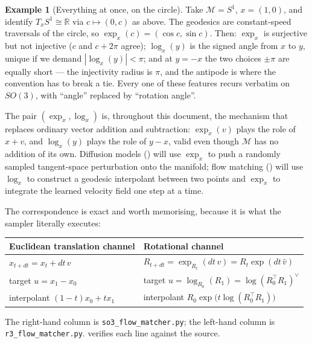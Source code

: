 \documentclass[11pt,a4paper]{report}
\theoremstyle{definition}
\newtheorem{example}[example]{Example}
\theoremstyle{remark}
\newcommand{\RR}{\mathbb R}
\newcommand{\file}[1]{\texttt{#1}}
\begin{document}
\begin{example}[Everything at once, on the circle]
Take $\mathcal M=S^1$, $x=(1,0)$, and identify $T_xS^1\cong\RR$ via
$c\mapsto(0,c)$ as above. The geodesics are constant-speed traversals of the
circle, so $\exp_x(c)=(\cos c,\sin c)$. Then:
$\exp_x$ is surjective but not injective ($c$ and $c+2\pi$ agree);
$\log_x(y)$ is the signed angle from $x$ to $y$, unique if we demand
$|\log_x(y)|<\pi$; and at $y=-x$ the two choices $\pm\pi$ are equally
short --- the injectivity radius is $\pi$, and the antipode is where the
convention has to break a tie. Every one of these features recurs verbatim on
$SO(3)$, with ``angle'' replaced by ``rotation angle''.
\end{example}

The pair $(\exp_x,\log_x)$ is, throughout this document, the mechanism that
replaces ordinary vector addition and subtraction: $\exp_x(v)$ plays the
role of $x+v$, and $\log_x(y)$ plays the role of $y-x$, valid even though
$\mathcal M$ has no addition of its own. Diffusion models
() will use $\exp_x$ to push a randomly sampled
tangent-space perturbation onto the manifold; flow matching
() will use $\log_x$ to construct a
geodesic interpolant between two points and $\exp_x$ to integrate the
learned velocity field one step at a time.

\begin{tcolorbox}[colback=blue!3,colframe=blue!40!black,title=Why this matters for SigmaFlow]
The correspondence is exact and worth memorising, because it is what the
sampler literally executes:
\begin{center}
\begin{tabular}{ll}
\toprule
Euclidean translation channel & Rotational channel \\
\midrule
$x_{t+dt} = x_t + dt\,v$ & $R_{t+dt} = \exp_{R_t}(dt\,v) = R_t\exp(dt\,\widehat v)$ \\
target $u = x_1-x_0$ & target $u = \log_{R_0}(R_1) = \log(R_0^\top R_1)^\vee$ \\
interpolant $(1-t)x_0+tx_1$ & interpolant $R_0\exp\bigl(t\log(R_0^\top R_1)\bigr)$ \\
\bottomrule
\end{tabular}
\end{center}
The right-hand column is \file{so3\_flow\_matcher.py}; the left-hand column
is \file{r3\_flow\_matcher.py}.  verifies each line
against the source.
\end{tcolorbox}
\end{document}
